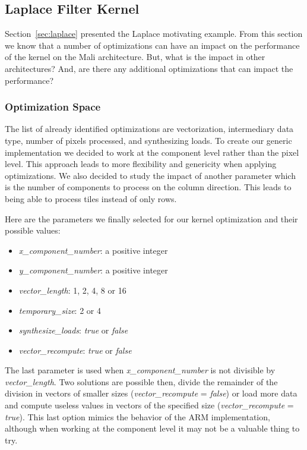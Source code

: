 \documentclass{IEEEtran}
\begin{document}
\subsection{Laplace Filter Kernel}

Section~\ref{sec:laplace} presented the Laplace motivating example. From this
section we know that a number of optimizations can have an impact on the
performance of the kernel on the Mali architecture. But, what is the impact in
other architectures? And, are there any additional optimizations that can impact
the performance?

\subsubsection{Optimization Space}

The list of already identified optimizations are vectorization, intermediary
data type, number of pixels processed, and synthesizing loads.  To create our
generic implementation we decided to work at the component level rather than the
pixel level. This approach leads to more flexibility and genericity when
applying optimizations. We also decided to study the impact of another parameter
which is the number of components to process on the column direction. This leads
to being able to process tiles instead of only rows.

Here are the parameters we finally selected for our kernel optimization and
their possible values:
\begin{itemize}
\item \emph{x\_component\_number}: a positive integer
\item \emph{y\_component\_number}: a positive integer
\item \emph{vector\_length}: 1, 2, 4, 8 or 16
\item \emph{temporary\_size}: 2 or 4
\item \emph{synthesize\_loads}: \emph{true} or \emph{false}
\item \emph{vector\_recompute}: \emph{true} or \emph{false}
\end{itemize}
The last parameter is used when \emph{x\_component\_number} is not divisible by
\emph{vector\_length}. Two solutions are possible then, divide the remainder
of the division in vectors of smaller sizes (\emph{vector\_recompute} =
\emph{false}) or load more data and compute useless values in vectors of the
specified size (\emph{vector\_recompute} = \emph{true}).
This last option mimics the behavior of the ARM implementation, although when
working at the component level it may not be a valuable thing to try.
\end{document}
